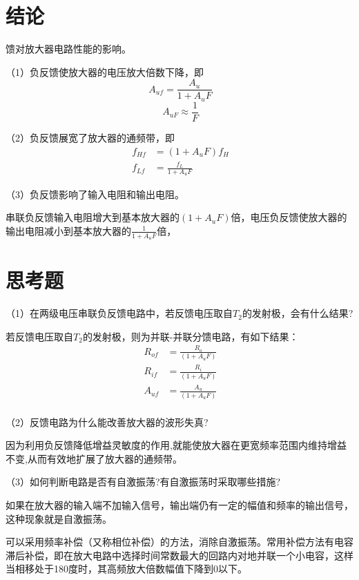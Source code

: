 \documentclass{article}
\begin{document}
\section{结论}
馈对放大器电路性能的影响。\par
			   （1）负反馈使放大器的电压放大倍数下降，即
			   \begin{equation*}
                \ A_{uf}=\frac{A_u}{1+A_{u}F}
			   \end{equation*}
               \begin{equation*}
                \ A_{uF}\approx \frac{1}{F}
               \end{equation*}
               \par
			   （2）负反馈展宽了放大器的通频带，即
               \begin{align*}
                \ f_{Hf}&=(1+A_{u}F)f_H \\
                \ f_{Lf}&=\frac{f_L}{1+A_{u}F}
               \end{align*}   
               \par
                （3）负反馈影响了输入电阻和输出电阻。\par
            串联负反馈输入电阻增大到基本放大器的$(1+A_{u}F)$倍，电压负反馈使放大器的输出电阻减小到基本放大器的$\frac{1}{1+A_{u}F}$倍，\par

\section{思考题}
（1）在两级电压串联负反馈电路中，若反馈电压取自$T_2$的发射极，会有什么结果?\par
若反馈电压取自$T_2$的发射极，则为并联-并联分馈电路，有如下结果：
\begin{align*}
	\ R_{of}&=\frac{R_o}{(1+A_{u}F)}\\
	\ R_{if}&=\frac{R_i}{(1+A_{u}F)}\\
	\ A_{uf}&=\frac{A_u}{(1+A_{u}F)}\\
   \end{align*}  
   \par
（2）反馈电路为什么能改善放大器的波形失真?\par
因为利用负反馈降低增益灵敏度的作用,就能使放大器在更宽频率范围内维持增益不变,从而有效地扩展了放大器的通频带。\par
（3）如何判断电路是否有自激振荡?有自激振荡时采取哪些措施?\par
如果在放大器的输入端不加输入信号，输出端仍有一定的幅值和频率的输出信号，这种现象就是自激振荡。\par
可以采用频率补偿（又称相位补偿）的方法，消除自激振荡。常用补偿方法有电容滞后补偿，即在放大电路中选择时间常数最大的回路内对地并联一个小电容，这样当相移处于180度时，其高频放大倍数幅值下降到0以下。\par
\end{document}

